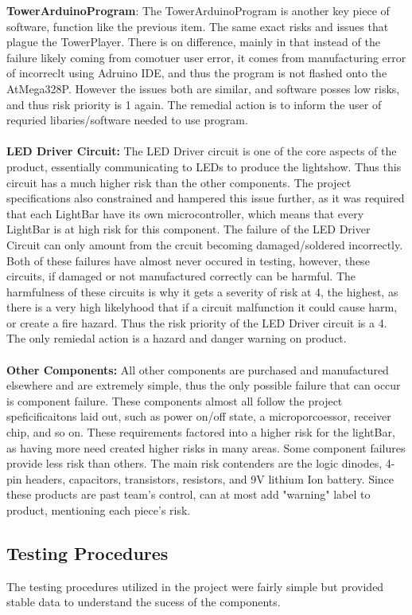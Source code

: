 \documentclass[12pt]{article}
\begin{document}
{{{{			\textbf{TowerArduinoProgram}: The TowerArduinoProgram is another key piece of software, function like the previous item. The same exact risks and issues that plague the TowerPlayer. There is on difference, mainly in that instead of the failure likely coming from comotuer user error, it comes from manufacturing error of incorreclt using Adruino IDE, and thus the program is not flashed onto the AtMega328P. However the issues both are similar, and software posses low risks, and thus risk priority is 1 again. The remedial action is to inform the user of requried libaries/software needed to use program.\\ \\
			\textbf{LED Driver Circuit:} The LED Driver circuit is one of the core aspects of the product, essentially communicating to LEDs to produce the lightshow. Thus this circuit has a much higher risk than the other components. The project specifications also constrained and hampered this issue further, as it was required that each LightBar have its own microcontroller, which means that every LightBar is at high risk for this component. The failure of the LED Driver Circuit can only amount from the crcuit becoming damaged/soldered incorrectly. Both of these failures have almost never occured in testing, however, these circuits, if damaged or not manufactured correctly can be harmful. The harmfulness of these circuits is why it gets a severity of risk at 4, the highest, as there is a very high likelyhood that if a circuit malfunction it could cause harm, or create a fire hazard. Thus the risk priority of the LED Driver circuit is a 4. The only remiedal action is a hazard and danger warning on product. \\ \\
			\textbf{Other Components:} All other components are purchased and manufactured elsewhere and are extremely simple, thus the only possible failure that can occur is component failure. These components almost all follow the project speficificaitons laid out, such as power on/off state, a microporcoessor, receiver chip, and so on. These requirements factored into a higher risk for the lightBar, as having more need created higher risks in many areas. Some component failures provide less risk than others. The main risk contenders are the logic dinodes, 4-pin headers, capacitors, transistors, resistors, and 9V lithium Ion battery. Since these products are past team's control, can at most add "warning" label to product, mentioning each piece's risk.
		
		
		\subsection{Testing Procedures}
		The testing procedures utilized in the project were fairly simple but provided stable data to understand the sucess of the components.
		
}}}}
\end{document}
